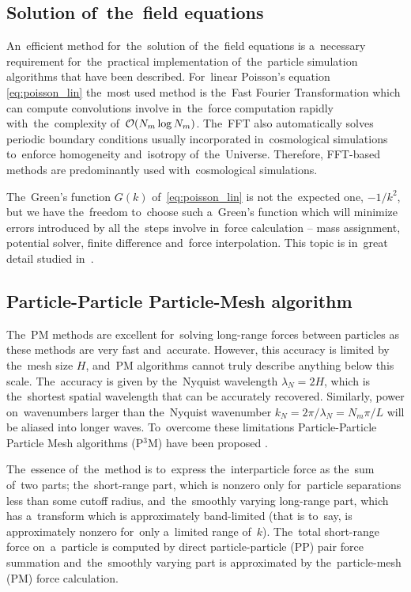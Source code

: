 \subsection{Solution of~the~field equations}
An~efficient method for~the~solution of~the~field equations is a~necessary requirement for~the~practical implementation of~the~particle simulation algorithms that have been described. For~linear Poisson’s equation \eqref{eq:poisson_lin} the~most used method is the~Fast Fourier Transformation which can compute convolutions involve in~the~force computation rapidly with~the~complexity of~$\mathcal{O}(N_m\log N_m)$. The~FFT also automatically solves periodic boundary conditions usually incorporated in~cosmological simulations to~enforce homogeneity and~isotropy of~the~Universe. Therefore, FFT-based methods are predominantly used with~cosmological simulations.

The~Green's function $G(k)$ of~\eqref{eq:poisson_lin} is not the~expected one, $-1/k^2$, but we have the~freedom to~choose such a~Green's function which will minimize errors introduced by all the~steps involve in~force calculation -- mass assignment, potential solver, finite difference and~force interpolation. This topic is in~great detail studied in~\textcite{Hockney:1988:CSU:62815}.
\subsection{Particle-Particle Particle-Mesh algorithm}
The~PM methods are excellent for~solving long-range forces between particles as these methods are very fast and~accurate. However, this accuracy is limited by the~mesh size $H$, and~PM algorithms cannot truly describe anything below this scale. The~accuracy is given by the~Nyquist wavelength $\lambda_N=2H$, which is the~shortest spatial wavelength that can be accurately recovered. Similarly, power on~wavenumbers larger than the~Nyquist wavenumber $k_N=2\pi/\lambda_N=N_m\pi/L$ will be aliased into longer waves. To~overcome these limitations Particle-Particle Particle Mesh algorithms (P$^3$M) have been proposed \textcite{hockney_10000_1973}.

The~essence of~the~method is to~express the~interparticle force as the~sum of~two parts; the~short-range part, which is nonzero only for~particle separations less than some cutoff radius, and~the~smoothly varying long-range part, which has a~transform which is approximately band-limited (that is to~say, is approximately nonzero for~only a~limited range of~$k$). The~total short-range force on~a~particle is computed by direct particle-particle (PP) pair force summation and~the~smoothly varying part is approximated by the~particle-mesh (PM) force calculation.

